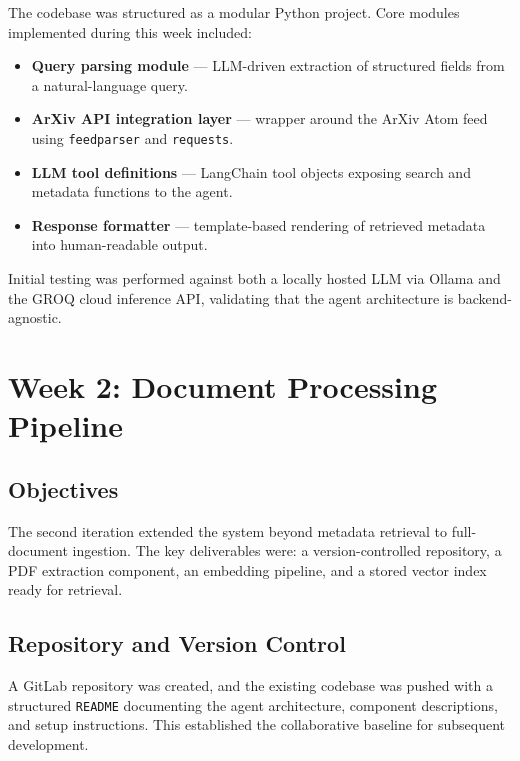 \documentclass[12pt, a4paper]{article}
\begin{document}
The codebase was structured as a modular Python project. Core modules
implemented during this week included:

\begin{itemize}[leftmargin=*]
    \item \textbf{Query parsing module} --- LLM-driven extraction of
          structured fields from a natural-language query.
    \item \textbf{ArXiv API integration layer} --- wrapper around the
          ArXiv Atom feed using \texttt{feedparser} and \texttt{requests}.
    \item \textbf{LLM tool definitions} --- LangChain tool objects
          exposing search and metadata functions to the agent.
    \item \textbf{Response formatter} --- template-based rendering of
          retrieved metadata into human-readable output.
\end{itemize}

Initial testing was performed against both a locally hosted LLM via
Ollama and the GROQ cloud inference API, validating that the agent
architecture is backend-agnostic.

\section{Week 2: Document Processing Pipeline}
\label{sec:week2}

\subsection{Objectives}

The second iteration extended the system beyond metadata retrieval to
full-document ingestion. The key deliverables were: a version-controlled
repository, a PDF extraction component, an embedding pipeline, and a
stored vector index ready for retrieval.

\subsection{Repository and Version Control}

A GitLab repository was created, and the existing codebase was pushed
with a structured \texttt{README} documenting the agent architecture,
component descriptions, and setup instructions. This established the
collaborative baseline for subsequent development.
\end{document}
